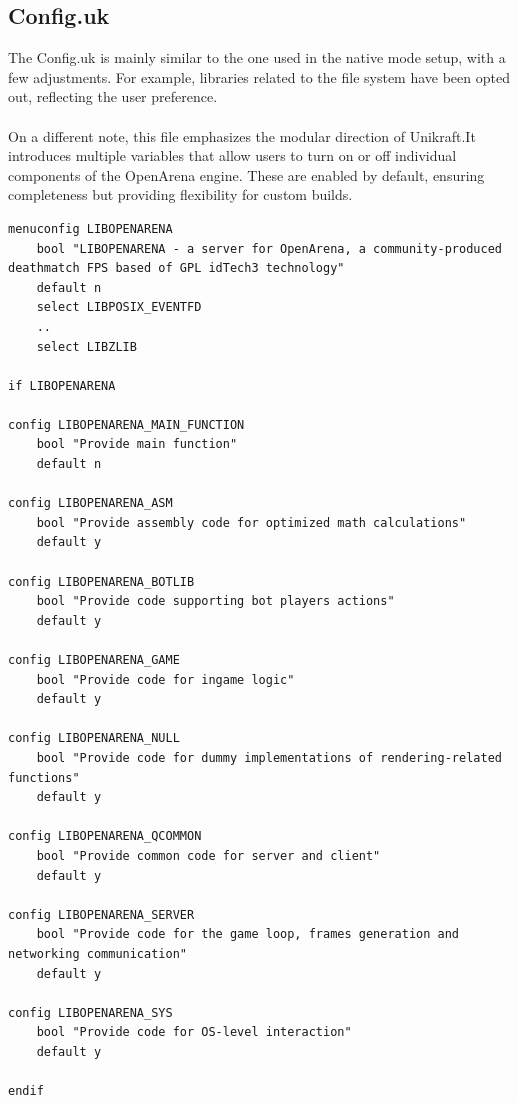 \subsection{Config.uk}
The Config.uk is mainly similar to the one used in the native mode setup, with a few adjustments.
For example, libraries related to the file system have been opted out, reflecting the user preference. \\ \\
On a different note, this file emphasizes the modular direction of Unikraft.\@ It introduces multiple variables that allow users to turn on or off individual components of the
OpenArena engine. These are enabled by default, ensuring completeness but providing flexibility for custom builds.
\\
\lstset{basicstyle=\small\ttfamily, caption= Part of Config.uk, language=C, showstringspaces=false, keepspaces=true}
\begin{lstlisting}
menuconfig LIBOPENARENA
    bool "LIBOPENARENA - a server for OpenArena, a community-produced deathmatch FPS based of GPL idTech3 technology"
    default n
    select LIBPOSIX_EVENTFD
    ..
    select LIBZLIB

if LIBOPENARENA

config LIBOPENARENA_MAIN_FUNCTION
    bool "Provide main function"
    default n

config LIBOPENARENA_ASM
    bool "Provide assembly code for optimized math calculations"
    default y

config LIBOPENARENA_BOTLIB
    bool "Provide code supporting bot players actions"
    default y

config LIBOPENARENA_GAME
    bool "Provide code for ingame logic"
    default y

config LIBOPENARENA_NULL
    bool "Provide code for dummy implementations of rendering-related functions"
    default y

config LIBOPENARENA_QCOMMON
    bool "Provide common code for server and client"
    default y

config LIBOPENARENA_SERVER
    bool "Provide code for the game loop, frames generation and networking communication"
    default y

config LIBOPENARENA_SYS
    bool "Provide code for OS-level interaction"
    default y

endif

\end{lstlisting}
\\
